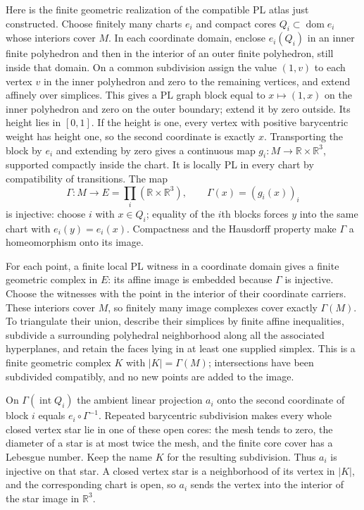 Here is the finite geometric realization of the compatible PL atlas just
constructed. Choose finitely many charts $e_i$ and compact cores
$Q_i\subset\operatorname{dom}e_i$ whose interiors cover $M$. In each
coordinate domain, enclose $e_i(Q_i)$ in an inner finite polyhedron and
then in the interior of an outer finite polyhedron, still inside that
domain. On a common subdivision assign the value $(1,v)$ to each vertex
$v$ in the inner polyhedron and zero to the remaining vertices, and
extend affinely over simplices. This gives a PL graph block equal to
$x\mapsto(1,x)$ on the inner polyhedron and zero on the outer boundary;
extend it by zero outside. Its height lies in $[0,1]$. If the height is
one, every vertex with positive barycentric weight has height one, so
the second coordinate is exactly $x$. Transporting the block by $e_i$
and extending by zero gives a continuous map
$g_i:M\to\mathbb R\times\mathbb R^3$, supported compactly inside the
chart. It is locally PL in every chart by compatibility of transitions.
The map
\[
 \Gamma:M\longrightarrow E=\prod_i(\mathbb R\times\mathbb R^3),
 \qquad \Gamma(x)=(g_i(x))_i
\]
is injective: choose $i$ with $x\in Q_i$; equality of the $i$th blocks
forces $y$ into the same chart with $e_i(y)=e_i(x)$. Compactness and the
Hausdorff property make $\Gamma$ a homeomorphism onto its image.

For each point, a finite local PL witness in a coordinate domain gives
a finite geometric complex in $E$: its affine image is embedded because
$\Gamma$ is injective. Choose the witnesses with the point in the
interior of their coordinate carriers. These interiors cover $M$, so
finitely many image complexes cover exactly $\Gamma(M)$. To triangulate
their union, describe their simplices by finite affine inequalities,
subdivide a surrounding polyhedral neighborhood along all the associated
hyperplanes, and retain the faces lying in at least one supplied simplex.
This is a finite geometric complex $K$ with $|K|=\Gamma(M)$; intersections
have been subdivided compatibly, and no new points are added to the image.

On $\Gamma(\operatorname{int}Q_i)$ the ambient linear projection $a_i$
onto the second coordinate of block $i$ equals $e_i\circ\Gamma^{-1}$.
Repeated barycentric subdivision makes every whole closed vertex star
lie in one of these open cores: the mesh tends to zero, the diameter of
a star is at most twice the mesh, and the finite core cover has a
Lebesgue number. Keep the name $K$ for the resulting subdivision.
Thus $a_i$ is injective on that star. A closed vertex star is a
neighborhood of its vertex in $|K|$, and the corresponding chart is
open, so $a_i$ sends the vertex into the interior of the star image in
$\mathbb R^3$.


